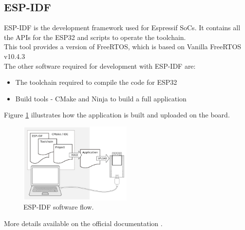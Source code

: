 \subsection{ESP-IDF}
ESP-IDF is the development framework used for Espressif SoCs. It contains all the APIs for the ESP32 and scripts to operate the toolchain.\\
This tool provides a version of FreeRTOS, which is based on Vanilla FreeRTOS v10.4.3\\ 
The other software required for development with ESP-IDF are:
\begin{itemize}
\item The toolchain required to compile the code for ESP32
\item Build tools - CMake and Ninja to build a full application 
\end{itemize}
Figure  \ref{fig:espidf} illustrates how the application is built and uploaded on the board.

\begin{figure}[H]
    \centering
    \vspace{0.5cm}
    \includegraphics[width=0.5\textwidth]{images/esp-idf.png}
    \caption{ESP-IDF software flow.}
    \label{fig:espidf} %
\end{figure}

More details available on the official documentation \cite{ESP-IDF-Page}.


